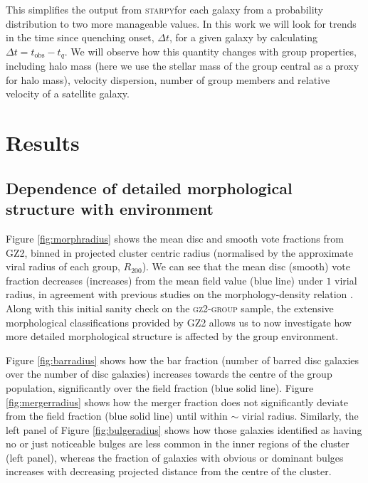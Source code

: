 \documentclass[useAMS,usenatbib]{mn2e}
\def\starpy ~{\textsc{starpy}}
\begin{document}
This simplifies the output from \starpy  ~for each galaxy from a probability distribution to two more manageable values. In this work we will look for trends in the time since quenching onset, $\Delta t$, for a given galaxy by calculating {\bf $\Delta t = t_\mathrm{obs} - t_{q}$}. We will observe how this quantity changes with group properties, including halo mass (here we use the stellar mass of the group central as a proxy for halo mass), velocity dispersion, number of group members and relative velocity of a satellite galaxy. 

\section{Results}\label{sec:results}
\subsection{Dependence of detailed morphological structure with environment}

Figure \ref{fig:morphradius} shows the mean disc and smooth vote fractions from GZ2, binned in projected cluster centric radius (normalised by the approximate viral radius of each group, $R_{200}$). We can see that the mean disc (smooth) vote fraction decreases (increases) from the mean field value (blue line) under $1$ virial radius, in agreement with previous studies on the morphology-density relation \citep{dressler80, smail97, poggianti99, postman05, bamford09}. Along with this initial sanity check on the \textsc{gz2-group} sample, the extensive morphological classifications provided by GZ2 allows us to now investigate how more detailed morphological structure is affected by the group environment.  

Figure \ref{fig:barradius} shows how the bar fraction (number of barred disc galaxies over the number of disc galaxies) increases towards the centre of the group population, significantly over the field fraction (blue solid line). Figure \ref{fig:mergerradius} shows how the merger fraction does not significantly deviate from the field fraction (blue solid line) until within $\sim$ virial radius. Similarly, the left panel of Figure \ref{fig:bulgeradius} shows how those galaxies identified as having no or just noticeable bulges are less common in the inner regions of the cluster (left panel), whereas the fraction of galaxies with obvious or dominant bulges increases with decreasing projected distance from the centre of the cluster.

\end{document}
